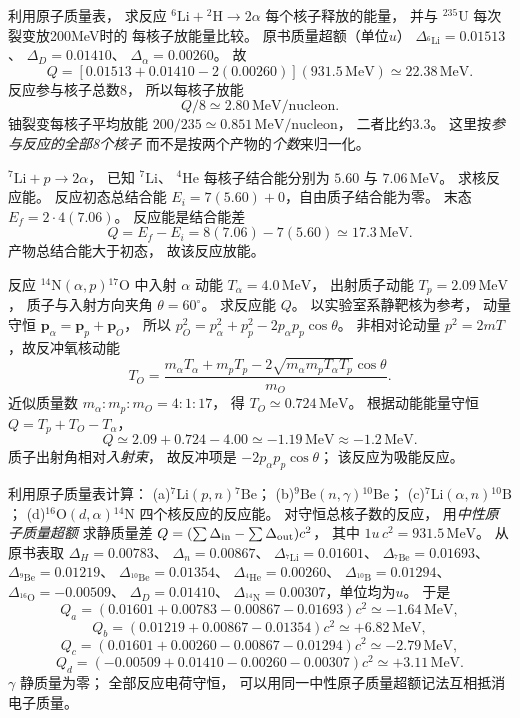 利用原子质量表，
求反应
$\mathrm{^{6}Li}+\mathrm{^{2}H}\to2\alpha$
每个核子释放的能量，
并与 $\mathrm{^{235}U}$ 每次裂变放200MeV时的
每核子放能量比较。
\exsolution
原书质量超额（单位$u$）
$\Delta_{\mathrm{^{6}Li}}=0.01513$、
$\Delta_D=0.01410$、
$\Delta_\alpha=0.00260$。
故
\[
 Q=[0.01513+0.01410-2(0.00260)]
 (931.5\,\mathrm{MeV})
 \simeq22.38\,\mathrm{MeV}.
\]
反应参与核子总数8，
所以每核子放能
\[
 \boxed{Q/8\simeq2.80\,\mathrm{MeV/nucleon}}.
\]
铀裂变每核子平均放能
$\boxed{200/235\simeq0.851\,\mathrm{MeV/nucleon}}$，
二者比约3.3。
\excheck 这里按\emph{参与反应的全部8个核子}
而不是按两个产物的\emph{个数}来归一化。

$\mathrm{^{7}Li}+p\to2\alpha$，
已知 $\mathrm{^{7}Li}$、
$\mathrm{^{4}He}$ 每核子结合能分别为
$5.60$ 与 $7.06\,\mathrm{MeV}$。
求核反应能。
\exsolution
反应初态总结合能
$E_i=7(5.60)+0$，自由质子结合能为零。
末态
$E_f=2\cdot4(7.06)$。
反应能是结合能差
\[
 \boxed{Q=E_f-E_i=
 8(7.06)-7(5.60)\simeq17.3\,\mathrm{MeV}}.
\]
\excheck 产物总结合能大于初态，
故该反应放能。

反应
$\mathrm{^{14}N}(\alpha,p)\mathrm{^{17}O}$
中入射 $\alpha$ 动能
$T_\alpha=4.0\,\mathrm{MeV}$，
出射质子动能
$T_p=2.09\,\mathrm{MeV}$，
质子与入射方向夹角
$\theta=60^\circ$。
求反应能 $Q$。
\exsolution
以实验室系静靶核为参考，
动量守恒
$\boldsymbol p_\alpha=\boldsymbol p_p+\boldsymbol p_O$，
所以
$p_O^2=p_\alpha^2+p_p^2-2p_\alpha p_p\cos\theta$。
非相对论动量
$p^2=2mT$，故反冲氧核动能
\[
 T_O=\frac{m_\alpha T_\alpha+m_p T_p
 -2\sqrt{m_\alpha m_pT_\alpha T_p}\cos\theta}{m_O}.
\]
近似质量数 $m_\alpha:m_p:m_O=4:1:17$，
得
$T_O\simeq0.724\,\mathrm{MeV}$。
根据动能能量守恒
$Q=T_p+T_O-T_\alpha$，
\[
 \boxed{Q\simeq2.09+0.724-4.00
 \simeq-1.19\,\mathrm{MeV}\approx-1.2\,\mathrm{MeV}}.
\]
\excheck 质子出射角相对\emph{入射束}，
故反冲项是
$-2p_\alpha p_p\cos\theta$；
该反应为吸能反应。

利用原子质量表计算：
(a)$\mathrm{^{7}Li}(p,n)\mathrm{^{7}Be}$；
(b)$\mathrm{^{9}Be}(n,\gamma)\mathrm{^{10}Be}$；
(c)$\mathrm{^{7}Li}(\alpha,n)\mathrm{^{10}B}$；
(d)$\mathrm{^{16}O}(d,\alpha)\mathrm{^{14}N}$
四个核反应的反应能。
\exsolution
对守恒总核子数的反应，
用\emph{中性原子质量超额}
求静质量差
$Q=(\sum\Delta_{\rm in}-\sum\Delta_{\rm out})c^2$，
其中
$1u\,c^2=931.5\,\mathrm{MeV}$。
从原书表取
$\Delta_H=0.00783$、
$\Delta_n=0.00867$、
$\Delta_{\mathrm{^{7}Li}}=0.01601$、
$\Delta_{\mathrm{^{7}Be}}=0.01693$、
$\Delta_{\mathrm{^{9}Be}}=0.01219$、
$\Delta_{\mathrm{^{10}Be}}=0.01354$、
$\Delta_{\mathrm{^{4}He}}=0.00260$、
$\Delta_{\mathrm{^{10}B}}=0.01294$、
$\Delta_{\mathrm{^{16}O}}=-0.00509$、
$\Delta_D=0.01410$、
$\Delta_{\mathrm{^{14}N}}=0.00307$，单位均为$u$。
于是
\[
 \boxed{Q_a=(0.01601+0.00783-0.00867-0.01693)c^2
 \simeq-1.64\,\mathrm{MeV}},
\]
\[
 \boxed{Q_b=(0.01219+0.00867-0.01354)c^2
 \simeq+6.82\,\mathrm{MeV}},
\]
\[
 \boxed{Q_c=(0.01601+0.00260-0.00867-0.01294)c^2
 \simeq-2.79\,\mathrm{MeV}},
\]
\[
 \boxed{Q_d=(-0.00509+0.01410-0.00260-0.00307)c^2
 \simeq+3.11\,\mathrm{MeV}}.
\]
\excheck $\gamma$ 静质量为零；
全部反应电荷守恒，
可以用同一中性原子质量超额记法互相抵消电子质量。
